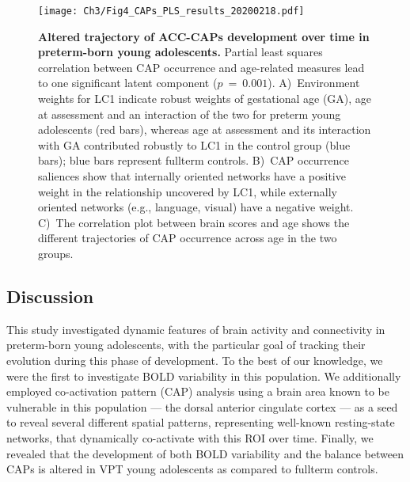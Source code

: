 \begin{figure}[h]
\centering\texttt{[image: Ch3/Fig4\_CAPs\_PLS\_results\_20200218.pdf]}
\caption{\textbf{Altered trajectory of ACC-CAPs development over time in preterm-born young adolescents.} Partial least squares correlation between CAP occurrence and age-related measures lead to one significant latent component ($p~=~0.001$).   A)~Environment weights for LC1  indicate robust weights of gestational age (GA), age at assessment and an interaction of the two for preterm young adolescents (red bars), whereas age at assessment and its interaction with GA contributed robustly to LC1 in the control group (blue bars); blue bars represent fullterm controls. B)~CAP occurrence saliences show that internally oriented networks have a positive weight in the relationship uncovered by LC1, while externally oriented networks (e.g., language, visual) have a negative weight.  C)~The correlation plot between brain scores and age shows the different trajectories of CAP occurrence across age in the two groups.} \label{fig:PLS_CAPs}
\end{figure}




\subsection{Discussion}

This study investigated dynamic features of brain activity and connectivity in preterm-born young adolescents, with the particular goal of tracking their evolution during this phase of development. To the best of our knowledge, we were the first to investigate BOLD variability in this population.  We additionally employed co-activation pattern (CAP) analysis using a brain area known to be vulnerable in this population --- the dorsal anterior cingulate cortex --- as a seed to reveal several different spatial patterns, representing well-known resting-state networks, that dynamically co-activate with this ROI over time. Finally, we revealed that the development of both BOLD variability and the balance between CAPs is altered in VPT young adolescents as compared to fullterm controls. 


